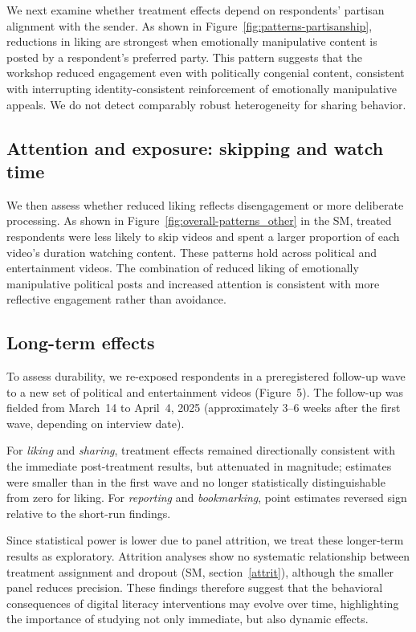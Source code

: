 \documentclass[12pt]{article}
\begin{document}
We next examine whether treatment effects depend on respondents’ partisan alignment with the sender. As shown in Figure~\ref{fig:patterns-partisanship}, reductions in liking are strongest when emotionally manipulative content is posted by a respondent’s preferred party. This pattern suggests that the workshop reduced engagement even with politically congenial content, consistent with interrupting identity-consistent reinforcement of emotionally manipulative appeals. We do not detect comparably robust heterogeneity for sharing behavior.

\subsection*{Attention and exposure: skipping and watch time}

We then assess whether reduced liking reflects disengagement or more deliberate processing. As shown in Figure~\ref{fig:overall-patterns_other} in the SM, treated respondents were less likely to skip videos and spent a larger proportion of each video’s duration watching content. These patterns hold across political and entertainment videos. The combination of reduced liking of emotionally manipulative political posts and increased attention is consistent with more reflective engagement rather than avoidance.


\subsection*{Long-term effects}\label{longterm-effects}

To assess durability, we re-exposed respondents in a preregistered follow-up wave to a new set of political and entertainment videos (Figure~5). The follow-up was fielded from March~14 to April~4, 2025 (approximately 3--6 weeks after the first wave, depending on interview date).

For \textit{liking} and \textit{sharing}, treatment effects remained directionally consistent with the immediate post-treatment results, but attenuated in magnitude; estimates were smaller than in the first wave and no longer statistically distinguishable from zero for liking. For \textit{reporting} and \textit{bookmarking}, point estimates reversed sign relative to the short-run findings. 

Since  statistical power is lower due to panel attrition, we treat these longer-term results as exploratory. Attrition analyses show no systematic relationship between treatment assignment and dropout (SM, section~\ref{attrit}), although the smaller panel reduces precision. These findings therefore suggest that the behavioral consequences of digital literacy interventions may evolve over time, highlighting the importance of studying not only immediate, but also dynamic effects.
\end{document}
